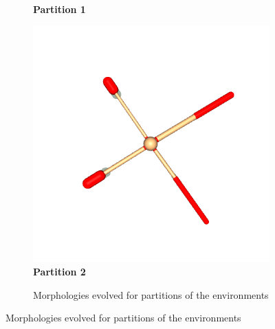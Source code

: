\begin{figure}[!htp]
\begin{subfigure}{\textwidth}
\begin{minipage}{0.19\textwidth}
                    \textbf{Partition 1}
                \end{minipage}
                \hfill
                \begin{minipage}{0.19\textwidth}
                    \centering
                    \includegraphics[width=\linewidth]{resources/partition_5_2906_3/ant_2.png}
                    \textbf{Partition 2}
                \end{minipage}
                \caption{Morphologies evolved for partitions of the environments}
                \label{fig:part_ant_images}
            \end{subfigure}


\end{figure}

